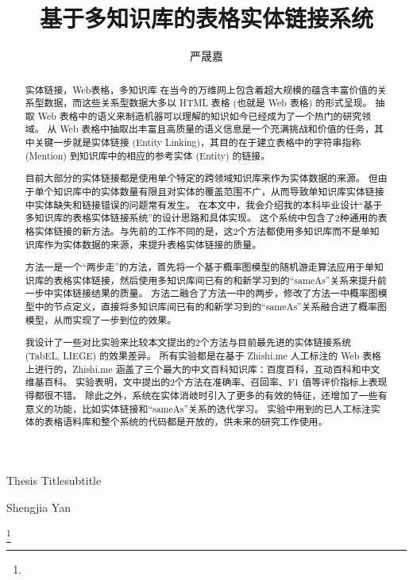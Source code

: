 \documentclass[bachelor]{seuthesis} %
\begin{document}

\title{基于多知识库的表格实体链接系统}{}{Thesis Title}{subtitle}
\author{严晟嘉}{Shengjia Yan}

\address{东南大学九龙湖校区}
\thanks{}
\maketitle

\begin{abstract}{实体链接，Web表格，多知识库}
在当今的万维网上包含着超大规模的蕴含丰富价值的关系型数据，而这些关系型数据大多以 HTML 表格 (也就是 Web 表格) 的形式呈现。
抽取 Web 表格中的语义来制造机器可以理解的知识如今已经成为了一个热门的研究领域。
从 Web 表格中抽取出丰富且高质量的语义信息是一个充满挑战和价值的任务，其中关键一步就是实体链接 (Entity Linking)，其目的在于建立表格中的字符串指称 (Mention) 到知识库中的相应的参考实体 (Entity) 的链接。\par

目前大部分的实体链接都是使用单个特定的跨领域知识库来作为实体数据的来源。
但由于单个知识库中的实体数量有限且对实体的覆盖范围不广，从而导致单知识库实体链接中实体缺失和链接错误的问题常有发生。
在本文中，我会介绍我的本科毕业设计``基于多知识库的表格实体链接系统''的设计思路和具体实现。
这个系统中包含了2种通用的表格实体链接的新方法。与先前的工作不同的是，这2个方法都使用多知识库而不是单知识库作为实体数据的来源，来提升表格实体链接的质量。\par

方法一是一个``两步走''的方法，首先将一个基于概率图模型的随机游走算法应用于单知识库的表格实体链接，然后使用多知识库间已有的和新学习到的``sameAs''关系来提升前一步中实体链接结果的质量。
方法二融合了方法一中的两步，修改了方法一中概率图模型中的节点定义，直接将多知识库间已有的和新学习到的``sameAs''关系融合进了概率图模型，从而实现了一步到位的效果。\par

我设计了一些对比实验来比较本文提出的2个方法与目前最先进的实体链接系统 (TabEL, LIEGE) 的效果差异。
所有实验都是在基于 Zhishi.me 人工标注的 Web 表格上进行的，Zhishi.me 涵盖了三个最大的中文百科知识库：百度百科，互动百科和中文维基百科。
实验表明，文中提出的2个方法在准确率、召回率、F1 值等评价指标上表现得都很不错。
除此之外，系统在实体消岐时引入了更多的有效的特征，还增加了一些有意义的功能，比如实体链接和``sameAs''关系的迭代学习。
实验中用到的已人工标注实体的表格语料库和整个系统的代码都是开放的，供未来的研究工作使用。
\end{abstract}
\end{document}
